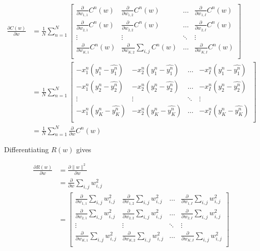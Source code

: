 \documentclass{article}
\begin{document}
\begin{align}
    \frac{\partial C(w)}{\partial w} &= \frac{1}{N} \sum_{n=1}^N 
    \begin{bmatrix}
    \frac{\partial}{\partial w_{1,1}} C^n(w) & \frac{\partial}{\partial w_{1,2}} C^n(w) & \dots & \frac{\partial}{\partial w_{1,I}} C^n(w) \\
    \frac{\partial}{\partial w_{2,1}} C^n(w) & \frac{\partial}{\partial w_{2,2}} C^n(w)& \dots & \frac{\partial}{\partial w_{2,I}} C^n(w) \\
    \vdots & \vdots & \ddots & \vdots \\
    \frac{\partial}{\partial w_{K,1}} C^n(w) & \frac{\partial}{\partial w_{K,2}} \sum_{i,j}C^n(w)& \dots & \frac{\partial}{\partial w_{K,I}}C^n(w) \\
\end{bmatrix} \\
    &= \frac{1}{N} \sum_{n=1}^N  \begin{bmatrix}
    -x_1^n(y_1^n - \hat{y_1^n}) & -x_2^n(y_1^n - \hat{y_1^n}) & \dots & -x_I^n(y_1^n - \hat{y_1^n}) \\
    -x_1^n(y_2^n - \hat{y_2^n}) & -x_2^n(y_2^n - \hat{y_2^n}) & \dots & -x_I^n(y_2^n - \hat{y_2^n})  \\
    \vdots & \vdots & \ddots & \vdots \\
    -x_1^n(y_K^n - \hat{y_K^n}) & -x_2^n(y_K^n - \hat{y_K^n}) & \dots & -x_I^n(y_K^n - \hat{y_K^n}) \\
\end{bmatrix} \\
    &= \frac{1}{N} \sum_{n=1}^N \frac{\partial}{\partial w}C^n(w) \label{eq:dcw}
\end{align}

Differentiating $R(w)$ gives

\begin{align}
    \frac{\partial R(w)}{\partial w} &= \frac{\partial \|w\|^2}{\partial w} \\
    &= \frac{\partial}{\partial w} \sum_{i,j} w_{i,j}^2 \\
    &= \begin{bmatrix}
    \frac{\partial}{\partial w_{1,1}} \sum_{i,j} w_{i,j}^2 & \frac{\partial}{\partial w_{1,2}} \sum_{i,j} w_{i,j}^2 & \dots & \frac{\partial}{\partial w_{1,I}} \sum_{i,j} w_{i,j}^2 \\
    \frac{\partial}{\partial w_{2,1}} \sum_{i,j} w_{i,j}^2 & \frac{\partial}{\partial w_{2,2}} \sum_{i,j} w_{i,j}^2& \dots & \frac{\partial}{\partial w_{2,I}} \sum_{i,j}w_{i,j}^2 \\
    \vdots & \vdots & \ddots & \vdots \\
    \frac{\partial}{\partial w_{K,1}} \sum_{i,j} w_{i,j}^2 & \frac{\partial}{\partial w_{K,2}} \sum_{i,j} w_{i,j}^2& \dots & \frac{\partial}{\partial w_{K,I}} \sum_{i,j}w_{i,j}^2  \\
\end{bmatrix} \label{eq:matrix}
\end{align}
\end{document}
